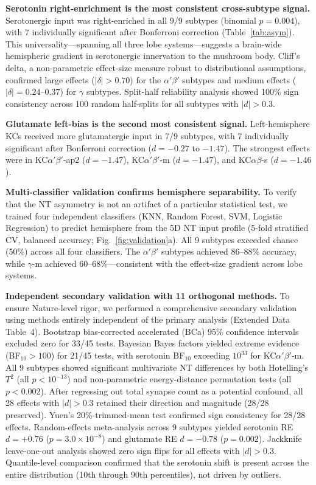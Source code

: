 \documentclass[10pt]{article}
\begin{document}
\textbf{Serotonin right-enrichment is the most consistent cross-subtype signal.} Serotonergic input was right-enriched in all 9/9 subtypes (binomial $p = 0.004$), with 7 individually significant after Bonferroni correction (Table~\ref{tab:asym}). This universality---spanning all three lobe systems---suggests a brain-wide hemispheric gradient in serotonergic innervation to the mushroom body. Cliff's delta, a non-parametric effect-size measure robust to distributional assumptions, confirmed large effects ($|\delta| > 0.70$) for the $\alpha'\beta'$ subtypes and medium effects ($|\delta| = 0.24$--$0.37$) for $\gamma$ subtypes. Split-half reliability analysis showed 100\% sign consistency across 100 random half-splits for all subtypes with $|d| > 0.3$.

\textbf{Glutamate left-bias is the second most consistent signal.} Left-hemisphere KCs received more glutamatergic input in 7/9 subtypes, with 7 individually significant after Bonferroni correction ($d = -0.27$ to $-1.47$). The strongest effects were in KC$\alpha'\beta'$-ap2 ($d = -1.47$), KC$\alpha'\beta'$-m ($d = -1.47$), and KC$\alpha\beta$-s ($d = -1.46$).

\textbf{Multi-classifier validation confirms hemisphere separability.} To verify that the NT asymmetry is not an artifact of a particular statistical test, we trained four independent classifiers (KNN, Random Forest, SVM, Logistic Regression) to predict hemisphere from the 5D NT input profile (5-fold stratified CV, balanced accuracy; Fig.~\ref{fig:validation}a). All 9 subtypes exceeded chance (50\%) across all four classifiers. The $\alpha'\beta'$ subtypes achieved 86--88\% accuracy, while $\gamma$-m achieved 60--68\%---consistent with the effect-size gradient across lobe systems.

\textbf{Independent secondary validation with 11 orthogonal methods.} To ensure Nature-level rigor, we performed a comprehensive secondary validation using methods entirely independent of the primary analysis (Extended Data Table~4). Bootstrap bias-corrected accelerated (BCa) 95\% confidence intervals excluded zero for 33/45 tests. Bayesian Bayes factors yielded extreme evidence (BF$_{10} > 100$) for 21/45 tests, with serotonin BF$_{10}$ exceeding $10^{33}$ for KC$\alpha'\beta'$-m. All 9 subtypes showed significant multivariate NT differences by both Hotelling's $T^2$ (all $p < 10^{-13}$) and non-parametric energy-distance permutation tests (all $p < 0.002$). After regressing out total synapse count as a potential confound, all 28 effects with $|d| > 0.3$ retained their direction and magnitude (28/28 preserved). Yuen's 20\%-trimmed-mean test confirmed sign consistency for 28/28 effects. Random-effects meta-analysis across 9 subtypes yielded serotonin RE $d = +0.76$ ($p = 3.0 \times 10^{-8}$) and glutamate RE $d = -0.78$ ($p = 0.002$). Jackknife leave-one-out analysis showed zero sign flips for all effects with $|d| > 0.3$. Quantile-level comparison confirmed that the serotonin shift is present across the entire distribution (10th through 90th percentiles), not driven by outliers.
\end{document}

